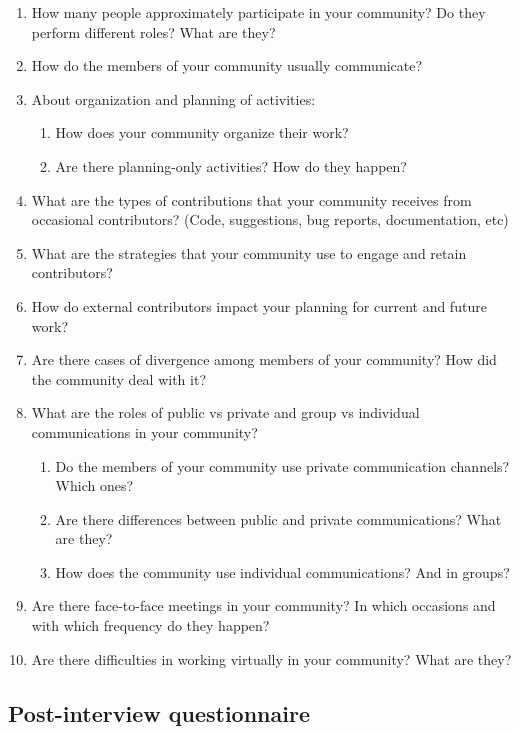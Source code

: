 \documentclass{sigchi}
\begin{document}
\begin{enumerate}
  \item How many people approximately participate in your community? Do they perform different roles? What are they?
  \item How do the members of your community usually communicate?
  \item About organization and planning of activities:
  \begin{enumerate}
    \item How does your community organize their work?
    \item Are there planning-only activities? How do they happen?
  \end{enumerate}
  \item What are the types of contributions that your community receives from occasional contributors? (Code, suggestions, bug reports, documentation, etc)
  \item What are the strategies that your community use to engage and retain contributors?
  \item How do external contributors impact your planning for current and future work?
  \item Are there cases of divergence among members of your community? How did the community deal with it?
  \item What are the roles of public vs private and group vs individual communications in your community?
  \begin{enumerate}
    \item Do the members of your community use private communication channels? Which ones?
    \item Are there differences between public and private communications? What are they?
    \item How does the community use individual communications? And in groups?
  \end{enumerate}
  \item Are there face-to-face meetings in your community? In which occasions and with which frequency do they happen?
  \item Are there difficulties in working virtually in your community? What are they?
\end{enumerate}


\subsection{Post-interview questionnaire}
\end{document}
